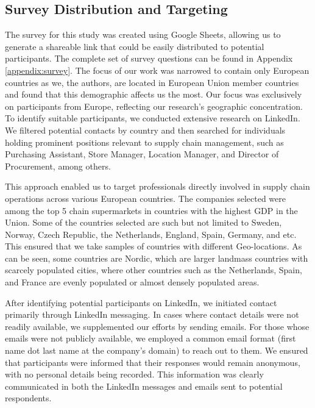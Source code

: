 \subsection{Survey Distribution and Targeting}

The survey for this study was created using Google Sheets, allowing us to generate a shareable link that could be easily distributed to potential participants. The complete set of survey questions can be found in Appendix \ref{appendix:survey}. The focus of our work was narrowed to contain only European countries as we, the authors, are located in European Union member countries and found that this demographic affects us the most. Our focus was exclusively on participants from Europe, reflecting our research's geographic concentration. To identify suitable participants, we conducted extensive research on LinkedIn. We filtered potential contacts by country and then searched for individuals holding prominent positions relevant to supply chain management, such as Purchasing Assistant, Store Manager, Location Manager, and Director of Procurement, among others. 

This approach enabled us to target professionals directly involved in supply chain operations across various European countries. The companies selected were among the top 5 chain supermarkets in countries with the highest GDP in the Union. Some of the countries selected are such but not limited to Sweden, Norway, Czech Republic, the Netherlands, England, Spain, Germany, and etc. This ensured that we take samples of countries with different Geo-locations. As can be seen, some countries are Nordic, which are larger landmass countries with scarcely populated cities, where other countries such as the Netherlands, Spain, and France are evenly populated or almost densely populated areas. 

After identifying potential participants on LinkedIn, we initiated contact primarily through LinkedIn messaging. In cases where contact details were not readily available, we supplemented our efforts by sending emails. For those whose emails were not publicly available, we employed a common email format (first name dot last name at the company's domain) to reach out to them. We ensured that participants were informed that their responses would remain anonymous, with no personal details being recorded. This information was clearly communicated in both the LinkedIn messages and emails sent to potential respondents. 

